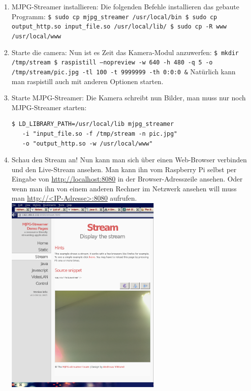 \documentclass[12pt,a4paper,titlepage]{scrartcl} %
\begin{document}
\begin{enumerate}
\item MJPG-Streamer installieren:\newline
\textnormal{Die folgenden Befehle installieren das gebaute Programm:}\newline
\texttt{\$ sudo cp mjpg\_streamer /usr/local/bin\newline
\$ sudo cp output\_http.so input\_file.so /usr/local/lib/\newline
\$ sudo cp -R www /usr/local/www}

\item Starte die camera:\newline
\textnormal{Nun ist es Zeit das Kamera-Modul anzuwerfen:}\newline
\texttt{\$ mkdir /tmp/stream\newline
\$ raspistill --nopreview -w 640 -h 480 -q 5 -o /tmp/stream/pic.jpg -tl 100 -t 9999999 -th 0:0:0 \&}\newline
\textnormal{Natürlich kann man raspistill auch mit anderen Optionen starten.}

\item Starte MJPG-Streamer:\newline
\textnormal{Die Kamera schreibt nun Bilder, man muss nur noch MJPG-Streamer starten:}\newline
\ttfamily
\begin{lstlisting}[breaklines]
$ LD_LIBRARY_PATH=/usr/local/lib mjpg_streamer 
   -i "input_file.so -f /tmp/stream -n pic.jpg" 
   -o "output_http.so -w /usr/local/www"
\end{lstlisting}
\normalfont

\item Schau den Stream an!\newline
\textnormal{Nun kann man sich über einen Web-Browser verbinden und den Live-Stream ansehen. Man kann ihn vom Raspberry Pi selbst per Eingabe von \url{http://localhost:8080} in der Browser-Adresszeile ansehen. Oder wenn man ihn von einem anderen Rechner im Netzwerk ansehen will muss man \url{http://<IP-Adresse>:8080} aufrufen.}\newline
	    \includegraphics[width=0.6\textwidth]{Streaming/MJPG-Streamer_cut}


\end{enumerate}
\end{document}
